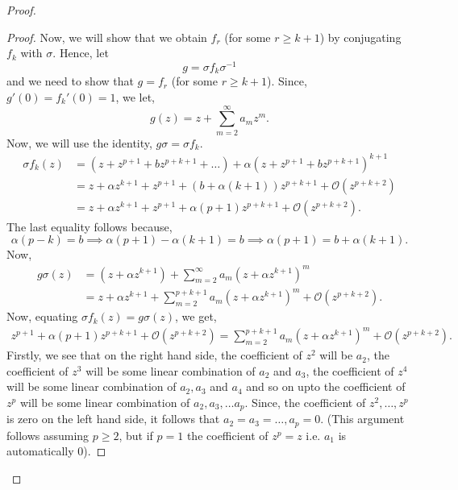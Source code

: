 \begin{proof}
\begin{proof}
	Now, we will show that we obtain \( f_r \) (for some \( r\ge k+1 \)) by conjugating 
	\( f_k \) with \( \sigma \).
	Hence, let \[
		g=\sigma f_k\sigma^{-1}
		\] and we need to show that \( g=f_r \) (for some \( r\ge k+1 \)). Since, \( g'(0)=f_k'(0)=1 \), we let, \[
	g(z)=z+\sum_{m=2}^\infty a_mz^m
	.\] 
	Now, we will use the identity, \( g\sigma=\sigma f_k \).
	\begin{align*}
		\sigma f_k(z)&=(z+z^{p+1}+bz^{p+k+1}+\ldots )+\alpha(z+z^{p+1}+bz^{p+k+1})^{k+1}\\
			   &=z+\alpha z^{k+1}+ z^{p+1}+(b+\alpha(k+1))z^{p+k+1}+\mathcal{O}(z^{p+k+2})\\
			   &=z+\alpha z^{k+1}+ z^{p+1}+\alpha(p+1)z^{p+k+1}+\mathcal{O}(z^{p+k+2})
	.\end{align*}
	The last equality follows because, \[ \alpha(p-k)=b\implies \alpha(p+1)-\alpha(k+1)=b\implies\alpha(p+1)=b+\alpha(k+1). \]
	Now,
	\begin{align*}
		g\sigma(z)&=(z+\alpha z^{k+1})+\sum_{m=2}^\infty a_m(z+\alpha z^{k+1})^m\\
				  &=z+\alpha z^{k+1}+\sum_{m=2}^{p+k+1}a_m(z+\alpha z^{k+1})^m+\mathcal{O}(z^{p+k+2})
	.\end{align*}
	Now, equating \( \sigma f_k(z)=g\sigma(z) \), we get,
	\begin{align*}
		z^{p+1}+\alpha(p+1)z^{p+k+1}+\mathcal{O}(z^{p+k+2})=\sum_{m=2}^{p+k+1} a_m(z+\alpha z^{k+1})^m+\mathcal{O}(z^{p+k+2})
	.\end{align*}
	Firstly, we see that on the right hand side, the coefficient of \( z^2 \) will be \( a_2 \),
	the coefficient of \( z^3 \) will be some linear combination of \( a_2 \) and \( a_3 \), the
	coefficient of \( z^4 \) will be some linear combination of \( a_2,a_3 \) and \( a_4 \) and so on upto the coefficient of \( z^p \) will be some linear combination of \( a_2,a_3,\ldots a_p \).
	Since, the coefficient of \( z^2,\ldots ,z^p \) is zero on the left hand side, it follows that \( a_2=a_3=\ldots, a_p=0 \). (This argument follows assuming \( p\ge 2 \), but if \( p=1 \) the coefficient of \( z^p=z \) i.e. \( a_1 \) is automatically \( 0 \)).


\end{proof}
\end{proof}
